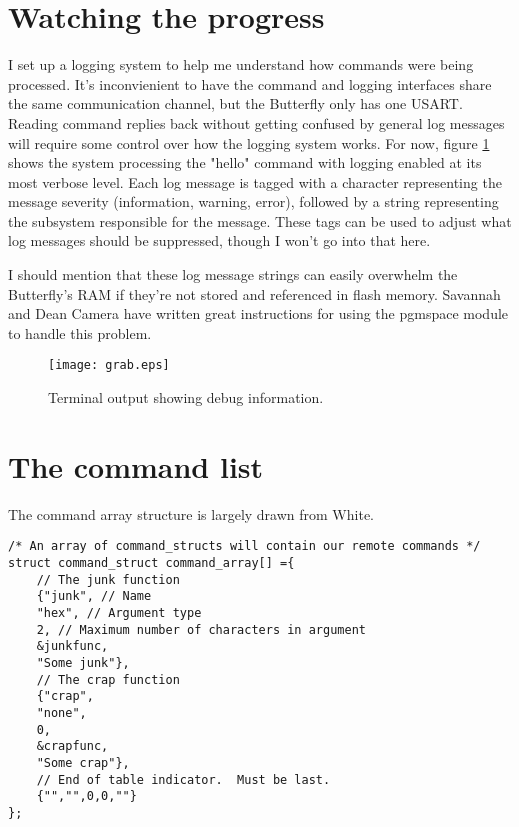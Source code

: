 \clearpage{}
\section{Watching the progress}
I set up a logging system to help me understand how commands were being processed.  It's inconvienient to have the command and logging interfaces share the same communication channel, but the Butterfly only has one USART.  Reading command replies back without getting confused by general log messages will require some control over how the logging system works.  For now, figure \ref{fig:termgrab} shows the system processing the "hello" command with logging enabled at its most verbose level.  Each log message is tagged with a character representing the message severity (information, warning, error), followed by a string representing the subsystem responsible for the message.  These tags can be used to adjust what log messages should be suppressed, though I won't go into that here.

I should mention that these log message strings can easily overwhelm the Butterfly's RAM if they're not stored and referenced in flash memory.  Savannah\cite{url:savannah:pgmspace} and Dean Camera\cite{url:deancamera:pgmspace} have written great instructions for using the pgmspace module to handle this problem.

\begin{figure}[ht]
    \begin{center}
        \texttt{[image: grab.eps]}
        \caption{Terminal output showing debug information.\label{fig:termgrab}}
    \end{center}
\end{figure}




\clearpage{}
\section{The command list}
The command array structure is largely drawn from White\cite{bok:white2012}.

\lstset{language=C}
\begin{lstlisting}[float, % Allows this listing to be a latex float
                   frame=single,
                   caption={Defining the command set with an array of
                            command structures.},
                   label=lst:cmdarray
                  ]
/* An array of command_structs will contain our remote commands */
struct command_struct command_array[] ={
    // The junk function
    {"junk", // Name
    "hex", // Argument type
    2, // Maximum number of characters in argument
    &junkfunc,
    "Some junk"},
    // The crap function
    {"crap",
    "none",
    0,
    &crapfunc,
    "Some crap"},
    // End of table indicator.  Must be last.
    {"","",0,0,""}
};
\end{lstlisting}

